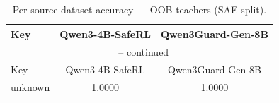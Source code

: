 \begin{landscape}
\begin{longtable}{lcc}
\caption{Per-source-dataset accuracy — OOB teachers (SAE split).} \\
\label{tab:oob_teachers_per_dataset_sae}
\toprule
Key & Qwen3-4B-SafeRL & Qwen3Guard-Gen-8B \\
\midrule
\endfirsthead
\multicolumn{3}{c}{\tablename\ \thetable{} -- continued} \\
\toprule
Key & Qwen3-4B-SafeRL & Qwen3Guard-Gen-8B \\
\midrule
\endhead
unknown & 1.0000 & 1.0000 \\
\bottomrule
\end{longtable}
\end{landscape}